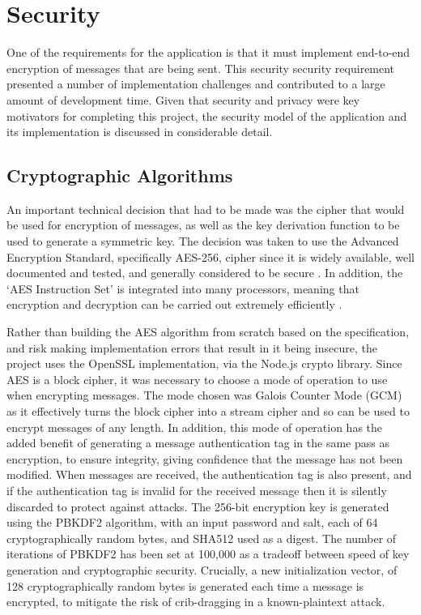 \section{Security}
One of the requirements for the application is that it must implement end-to-end encryption of messages that are being sent. This security security requirement presented a number of implementation challenges and contributed to a large amount of development time. Given that security and privacy were key motivators for completing this project, the security model of the application and its implementation is discussed in considerable detail.

\subsection{Cryptographic Algorithms}
An important technical decision that had to be made was the cipher that would be used for encryption of messages, as well as the key derivation function to be used to generate a symmetric key. The decision was taken to use the Advanced Encryption Standard, specifically AES-256, cipher since it is widely available, well documented and tested, and generally considered to be secure \cite{daemen2013design}. In addition, the `AES Instruction Set' is integrated into many processors, meaning that encryption and decryption can be carried out extremely efficiently \cite{bos2011efficient}. 

Rather than building the AES algorithm from scratch based on the specification, and risk making implementation errors that result in it being insecure, the project uses the OpenSSL implementation, via the Node.js crypto library. Since AES is a block cipher, it was necessary to choose a mode of operation to use when encrypting messages. The mode chosen was Galois Counter Mode (GCM) \cite{mcgrew2004galois} as it effectively turns the block cipher into a stream cipher and so can be used to encrypt messages of any length. In addition, this mode of operation has the added benefit of generating a message authentication tag in the same pass as encryption, to ensure integrity, giving confidence that the message has not been modified. When messages are received, the authentication tag is also present, and if the authentication tag is invalid for the received message then it is silently discarded to protect against attacks. The 256-bit encryption key is generated using the PBKDF2 algorithm, with an input password and salt, each of 64 cryptographically random bytes, and SHA512 used as a digest. The number of iterations of PBKDF2 has been set at 100,000 as a tradeoff between speed of key generation and cryptographic security. Crucially, a new initialization vector, of 128 cryptographically random bytes is generated each time a message is encrypted, to mitigate the risk of crib-dragging in a known-plaintext attack.

